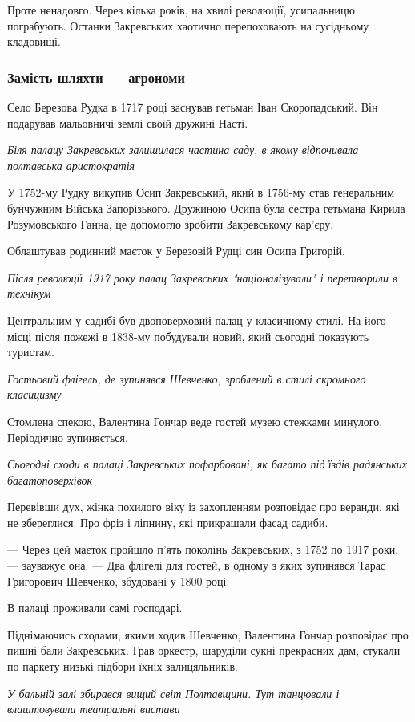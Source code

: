 \documentclass[a4paper,11pt]{extreport}
\begin{document}
Проте ненадовго. Через кілька років, на хвилі революції, усипальницю
пограбують. Останки Закревських хаотично перепоховають на сусідньому кладовищі.

\subsubsection{Замість шляхти --- агрономи}

Село Березова Рудка в 1717 році заснував гетьман Іван Скоропадський. Він
подарував мальовничі землі своїй дружині Насті.

\emph{Біля палацу Закревських залишилася частина саду, в якому відпочивала полтавська
аристократія}

У 1752-му Рудку викупив Осип Закревський, який в 1756-му став генеральним
бунчужним Війська Запорізького. Дружиною Осипа була сестра гетьмана Кирила
Розумовського Ганна, це допомогло зробити Закревському кар'єру.

Облаштував родинний маєток у Березовій Рудці син Осипа Григорій.

\emph{Після революції 1917 року палац Закревських "націоналізували" і перетворили в технікум}

Центральним у садибі був двоповерховий палац у класичному стилі. На його місці після пожежі в 1838-му побудували новий, який сьогодні показують туристам.

\emph{Гостьовий флігель, де зупинявся Шевченко, зроблений в стилі скромного класицизму}

Стомлена спекою, Валентина Гончар веде гостей музею стежками минулого. Періодично зупиняється.

\emph{Сьогодні сходи в палаці Закревських пофарбовані, як багато під'їздів радянських багатоповерхівок}

Перевівши дух, жінка похилого віку із захопленням розповідає про веранди, які
не збереглися. Про фріз і ліпнину, які прикрашали фасад садиби.

--- Через цей маєток пройшло п’ять поколінь Закревських, з 1752 по 1917 роки, ---
зауважує она. --- Два флігелі для гостей, в одному з яких зупинявся Тарас
Григорович Шевченко, збудовані у 1800 році.

В палаці проживали самі господарі.

Піднімаючись сходами, якими ходив Шевченко, Валентина Гончар розповідає про
пишні бали Закревських. Грав оркестр, шаруділи сукні прекрасних дам, стукали по
паркету низькі підбори їхніх залицяльників.

\emph{У бальній залі збирався вищий світ Полтавщини. Тут танцювали і влаштовували театральні вистави}
\end{document}
